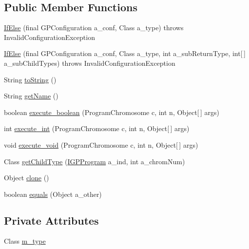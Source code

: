 \subsection*{Public Member Functions}
\begin{DoxyCompactItemize}
\item 
\hyperlink{classorg_1_1jgap_1_1gp_1_1function_1_1_if_else_a5ada337c0aca788759979d41613fd436}{If\-Else} (final G\-P\-Configuration a\-\_\-conf, Class a\-\_\-type)  throws Invalid\-Configuration\-Exception 
\item 
\hyperlink{classorg_1_1jgap_1_1gp_1_1function_1_1_if_else_aa9b584651421f567aaeee0099151145d}{If\-Else} (final G\-P\-Configuration a\-\_\-conf, Class a\-\_\-type, int a\-\_\-sub\-Return\-Type, int\mbox{[}$\,$\mbox{]} a\-\_\-sub\-Child\-Types)  throws Invalid\-Configuration\-Exception 
\item 
String \hyperlink{classorg_1_1jgap_1_1gp_1_1function_1_1_if_else_ac264ad447dec7621c519da2871c75cec}{to\-String} ()
\item 
String \hyperlink{classorg_1_1jgap_1_1gp_1_1function_1_1_if_else_ac88f282ff638d6de7e006f4828bda506}{get\-Name} ()
\item 
boolean \hyperlink{classorg_1_1jgap_1_1gp_1_1function_1_1_if_else_a59c2c8c56c5a2a7256cda53af8fef6f9}{execute\-\_\-boolean} (Program\-Chromosome c, int n, Object\mbox{[}$\,$\mbox{]} args)
\item 
int \hyperlink{classorg_1_1jgap_1_1gp_1_1function_1_1_if_else_adf3d8169286547b19db40b80ef097607}{execute\-\_\-int} (Program\-Chromosome c, int n, Object\mbox{[}$\,$\mbox{]} args)
\item 
void \hyperlink{classorg_1_1jgap_1_1gp_1_1function_1_1_if_else_a2bf4ec8fe7b9abc287a1d96814b8c329}{execute\-\_\-void} (Program\-Chromosome c, int n, Object\mbox{[}$\,$\mbox{]} args)
\item 
Class \hyperlink{classorg_1_1jgap_1_1gp_1_1function_1_1_if_else_a5a5e37d275c872d7b2a75b2e5d2cfd06}{get\-Child\-Type} (\hyperlink{interfaceorg_1_1jgap_1_1gp_1_1_i_g_p_program}{I\-G\-P\-Program} a\-\_\-ind, int a\-\_\-chrom\-Num)
\item 
Object \hyperlink{classorg_1_1jgap_1_1gp_1_1function_1_1_if_else_aeead87341a4141249a683298a63ba328}{clone} ()
\item 
boolean \hyperlink{classorg_1_1jgap_1_1gp_1_1function_1_1_if_else_a2f49407ddae2f774d05ccad6cac8ca79}{equals} (Object a\-\_\-other)
\end{DoxyCompactItemize}
\subsection*{Private Attributes}
\begin{DoxyCompactItemize}
\item 
Class \hyperlink{classorg_1_1jgap_1_1gp_1_1function_1_1_if_else_a12a1c2dd6d89630b9d08393d3e1503aa}{m\-\_\-type}
\end{DoxyCompactItemize}
